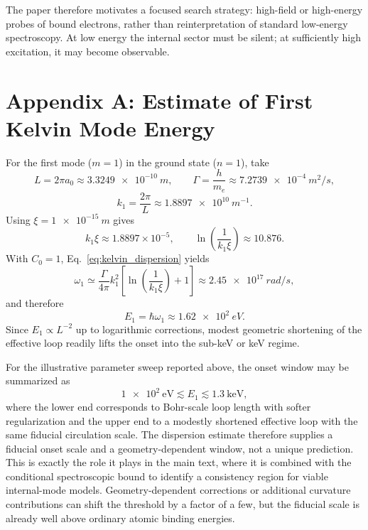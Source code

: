 \documentclass[pdflatex,sn-mathphys-num]{sn-jnl}
\begin{document}
        The paper therefore motivates a focused search strategy: high-field or high-energy probes of bound electrons, rather than reinterpretation of standard low-energy spectroscopy. At low energy the internal sector must be silent; at sufficiently high excitation, it may become observable.

        \appendix
    \section*{Appendix A: Estimate of First Kelvin Mode Energy}\label{app:first_kelvin}
        For the first mode ($m=1$) in the ground state ($n=1$), take
        \begin{equation}
            L = 2\pi a_0 \approx \SI{3.3249e-10}{m},
            \qquad
            \Gamma = \frac{h}{m_e} \approx \SI{7.2739e-4}{m^2/s},
        \end{equation}
        \begin{equation}
            k_1 = \frac{2\pi}{L} \approx \SI{1.8897e10}{m^{-1}}.
        \end{equation}
        Using $\xi = \SI{1e-15}{m}$ gives
        \begin{equation}
            k_1\xi \approx 1.8897\times 10^{-5},
            \qquad
            \ln\!\left(\frac{1}{k_1\xi}\right)\approx 10.876.
        \end{equation}
        With $C_0=1$, Eq.~\eqref{eq:kelvin_dispersion} yields
        \begin{equation}
            \omega_1 \simeq \frac{\Gamma}{4\pi} k_1^2 \!\left[ \ln\!\left( \frac{1}{k_1 \xi} \right) + 1 \right]
            \approx \SI{2.45e17}{rad/s},
        \end{equation}
        and therefore
        \begin{equation}
            E_1=\hbar\omega_1 \approx \SI{1.62e2}{eV}.
        \end{equation}
        Since $E_1\propto L^{-2}$ up to logarithmic corrections, modest geometric shortening of the effective loop readily lifts the onset into the sub-keV or keV regime.

        For the illustrative parameter sweep reported above, the onset window may be summarized as
        \begin{equation}
            \SI{1e2}{\electronvolt} \lesssim E_1 \lesssim \SI{1.3}{\kilo\electronvolt},
        \end{equation}
        where the lower end corresponds to Bohr-scale loop length with softer regularization and the upper end to a modestly shortened effective loop with the same fiducial circulation scale. The dispersion estimate therefore supplies a fiducial onset scale and a geometry-dependent window, not a unique prediction. This is exactly the role it plays in the main text, where it is combined with the conditional spectroscopic bound to identify a consistency region for viable internal-mode models. Geometry-dependent corrections or additional curvature contributions can shift the threshold by a factor of a few, but the fiducial scale is already well above ordinary atomic binding energies.
\end{document}
